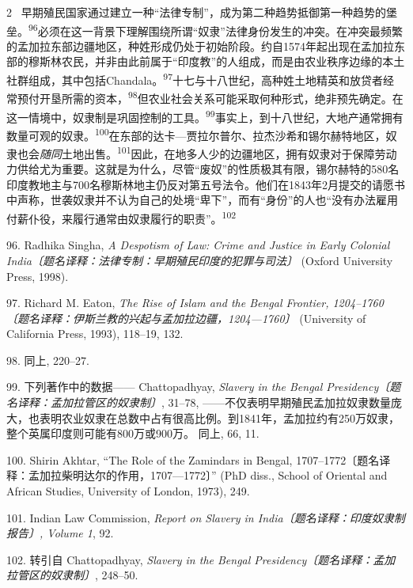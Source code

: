 \documentclass[10pt,a4paper]{article}
\begin{document}
\begin{paracol}{2}
\switchcolumn*
{\scriptsize\color{gray} [p. 19]}\ 早期殖民国家通过建立一种“法律专制”，成为第二种趋势抵御第一种趋势的堡\mbox{垒。\textsuperscript{96}}必须在这一背景下理解围绕所谓“奴隶”法律身份发生的冲突。在冲突最频繁的孟加拉东部边疆地区，种姓形成仍处于初始阶段。约自1574年起出现在孟加拉东部的穆斯林农民，并非由此前属于“印度教”的人组成，而是由农业秩序边缘的本土社群组成，其中包括Chandala。\nobreak\textsuperscript{97}十七与十八世纪，高种姓土地精英和放贷者经常预付开垦所需的资本，\nobreak\textsuperscript{98}但农业社会关系可能采取何种形式，绝非预先确定。在这一情境中，奴隶制是巩固控制的工\mbox{具。\textsuperscript{99}}事实上，到十八世纪，大地产通常拥有数量可观的奴\mbox{隶。\textsuperscript{100}}在东部的达卡—贾拉尔普尔、拉杰沙希和锡尔赫特地区，奴隶也会\textit{随同}土地出\mbox{售。\textsuperscript{101}}因此，在地多人少的边疆地区，拥有奴隶对于保障劳动力供给尤为重要。这就是为什么，尽管“废奴”的性质极其有限，锡尔赫特的580名印度教地主与700名穆斯林地主仍反对第五号法令。他们在1843年2月提交的请愿书中声称，世袭奴隶并不认为自己的处境“卑下”，而有“身份”的人也“没有办法雇用付薪仆役，来履行通常由奴隶履行的职责”。\nobreak\textsuperscript{102}\par{\small 96. Radhika Singha, \textit{A Despotism of Law: Crime and Justice in Early Colonial India〔题名译释：法律专制：早期殖民印度的犯罪与司法〕} (Oxford University Press, 1998).\par}{\small 97. Richard M. Eaton, \textit{The Rise of Islam and the Bengal Frontier, 1204–1760〔题名译释：伊斯兰教的兴起与孟加拉边疆，1204—1760〕} (University of California Press, 1993), 118–19, 132.\par}{\small 98. 同上, 220–27.\par}{\small 99. 下列著作中的数据—— Chattopadhyay, \textit{Slavery in the Bengal Presidency〔题名译释：孟加拉管区的奴隶制〕}, 31–78, ——不仅表明早期殖民孟加拉奴隶数量庞大，也表明农业奴隶在总数中占有很高比例。到1841年，孟加拉约有250万奴隶，整个英属印度则可能有800万或900万。 同上, 66, 11.\par}{\small 100. Shirin Akhtar, “The Role of the Zamindars in Bengal, 1707–1772〔题名译释：孟加拉柴明达尔的作用，1707—1772〕” (PhD diss., School of Oriental and African Studies, University of London, 1973), 249.\par}{\small 101. Indian Law Commission, \textit{Report on Slavery in India〔题名译释：印度奴隶制报告〕, Volume 1}, 92.\par}{\small 102. 转引自 Chattopadhyay, \textit{Slavery in the Bengal Presidency〔题名译释：孟加拉管区的奴隶制〕}, 248–50.\par}

\end{paracol}
\end{document}

